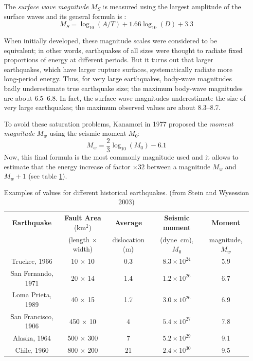 The \textit{surface wave magnitude} $M_S$ is measured using the largest
amplitude of the surface waves and its general formula is : 
\begin{equation}
    M_S= \log_{10} (A/T) + 1.66 \log_{10} (D) +3.3
\end{equation}

When initially developed, these magnitude scales were considered to be equivalent; in other words, earthquakes of all sizes were thought to radiate fixed proportions of energy at different periods. But it turns out that larger earthquakes, which have larger rupture surfaces, systematically radiate more long-period energy. Thus, for very large earthquakes, body-wave magnitudes badly underestimate true earthquake size; the maximum body-wave magnitudes are about 6.5--6.8. In fact, the surface-wave magnitudes underestimate the size of very large earthquakes; the maximum observed values are about 8.3--8.7.

To avoid these saturation problems, Kanamori in 1977 proposed the \textit{moment
magnitude} $M_w$ using the seismic moment $M_0$:
\begin{equation}
    M_w= \frac{2}{3} \log_{10} (M_0) - 6.1
\end{equation}
Now, this final formula is the most commonly magnitude used and it allows to estimate that the energy increase of factor $\times 32$  between a magnitude $M_w$ and $M_w+1$  (see table \ref{table_Seismic_Energy}).

\begin{table}[hbpt]
    \centering
    \caption{Examples of values for different historical earthquakes. (from Stein
    and Wysession 2003)}
    \label{table_Seismic_Energy}
    \begin{tabular}{ccccc}
        \toprule 
        \textbf{Earthquake} &
        \textbf{Fault Area} (km$^2$) &
        \textbf{Average} &
        \textbf{Seismic moment} &
        \textbf{Moment} \\ 
        & (length $\times$ width) & dislocation (m) & (\si{dyne.cm}), $M_0$ & magnitude,
        $M_w$ \\ 
        \midrule 
        Truckee, 1966 & 10 $\times$ 10 & 0.3  & $8.3 \times 10^{24}$ & 5.9 \\ 
        San Fernando, 1971 & 20 $\times$ 14 & 1.4  & $1.2 \times 10^{26}$ & 6.7 \\ 
        Loma Prieta, 1989 & 40 $\times$ 15 & 1.7 & $3.0 \times 10^{26}$ & 6.9 \\ 
        San Francisco, 1906 & 450 $\times$ 10& 4 & $5.4 \times 10^{27}$  & 7.8 \\ 
        Alaska, 1964 & 500 $\times$ 300 & 7 & $5.2 \times 10^{29}$ & 9.1 \\ 
        Chile, 1960 & 800 $\times$ 200 & 21 & $2.4 \times 10^{30}$ & 9.5 \\ 
        \bottomrule 
    \end{tabular} 
\end{table}

